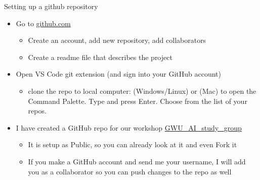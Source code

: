 \documentclass[aspectratio=169, 12pt]{beamer}
\begin{document}
\begin{frame}{Setting up a github repository}
    \begin{itemize}
        \item Go to \href{https://github.com/}{github.com}
        \begin{itemize}
            \item Create an account, add new repository, add collaborators
            \item Create a readme file that describes the project
        \end{itemize}
    \smallskip
        \item Open VS Code git extension (and sign into your GitHub account)
        \begin{itemize}
            \item clone the repo to local computer:  (Windows/Linux) or  (Mac) to open the Command Palette. Type  and press Enter. Choose from the list of your repos.
        \end{itemize}
    \smallskip
        \item I have created a GitHub repo for our workshop \href{https://github.com/tannerregan/GWU\_AI\_study\_group}{GWU\_AI\_study\_group}
        \begin{itemize}
            \item It is setup as Public, so you can already look at it and even Fork it 
            \item If you make a GitHub account and send me your username, I will add you as a collaborator so you can push changes to the repo as well
        \end{itemize}
    \end{itemize}
\end{frame}
\end{document}
